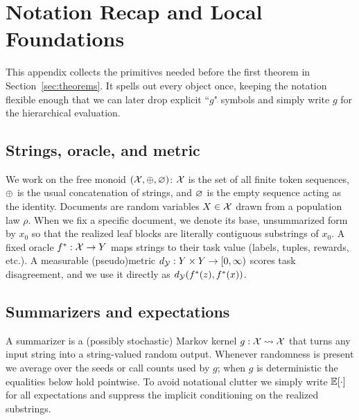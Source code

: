 
\section{Notation Recap and Local Foundations}
\label{app:notation}

This appendix collects the primitives needed before the first theorem in Section~\ref{sec:theorems}. It spells out every object once, keeping the notation flexible enough that we can later drop explicit ``$g$" symbols and simply write $g$ for the hierarchical evaluation.

\subsection{Strings, oracle, and metric}
We work on the free monoid $(\mathcal{X},\oplus,\varnothing)$: $\mathcal{X}$ is the set of all finite token sequences, $\oplus$ is the usual concatenation of strings, and $\varnothing$ is the empty sequence acting as the identity. Documents are random variables $X\in\mathcal{X}$ drawn from a population law $\rho$. When we fix a specific document, we denote its base, unsummarized form by $x_0$ so that the realized leaf blocks are literally contiguous substrings of $x_0$. A fixed oracle $f^{\ast}:\mathcal{X}\to Y$ maps strings to their task value (labels, tuples, rewards, etc.). A measurable (pseudo)metric $d_{\mathcal{Y}}:Y\times Y\to[0,\infty)$ scores task disagreement, and we use it directly as $d_{\mathcal{Y}}(f^{\ast}(z),f^{\ast}(x))$.

\subsection{Summarizers and expectations}
A summarizer is a (possibly stochastic) Markov kernel $g:\mathcal{X}\rightsquigarrow\mathcal{X}$ that turns any input string into a string-valued random output. Whenever randomness is present we average over the seeds or call counts used by $g$; when $g$ is deterministic the equalities below hold pointwise. To avoid notational clutter we simply write $\mathbb{E}[\cdot]$ for all expectations and suppress the implicit conditioning on the realized substrings.

